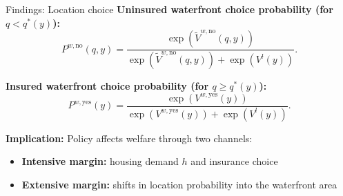\documentclass[xcolor=dvipsnames, aspectratio = 169]{beamer}
\begin{document}
{\begin{frame}{Findings: Location choice}
\medskip
\textbf{Uninsured waterfront choice probability (for $q<q^*(y)$):}
\[
P^{w,\text{no}}(q,y)=
\frac{\exp\left(\tilde V^{w,\text{no}}(q,y)\right)}
{\exp\left(\tilde V^{w,\text{no}}(q,y)\right)+\exp\left(V^l(y)\right)}.
\]

\textbf{Insured waterfront choice probability (for $q\ge q^*(y)$):}
\[
P^{w,\text{yes}}(y)=
\frac{\exp\left(V^{w,\text{yes}}(y)\right)}
{\exp\left(V^{w,\text{yes}}(y)\right)+\exp\left(V^l(y)\right)}.
\]

\medskip
\textbf{Implication:} Policy affects welfare through two channels:
\begin{itemize}
  \item \textbf{Intensive margin:} housing demand $h$ and insurance choice
  \item \textbf{Extensive margin:} shifts in location probability into the waterfront area
\end{itemize}
\end{frame}

}
\end{document}
